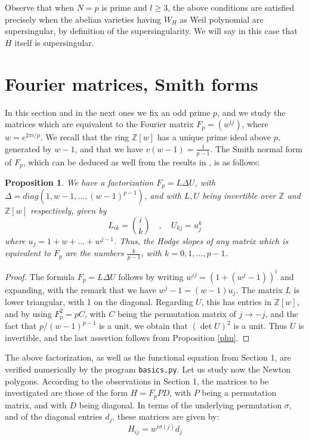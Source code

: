 \documentclass[11pt]{amsart}
\newtheorem{proposition}[theorem]{Proposition}
\theoremstyle{definition}
\begin{document}
Observe that when $N=p$ is prime and $l\geq3$, the above conditions are satisfied precisely when the abelian varieties having $W_H$ as Weil polynomial are supersingular, by definition of the supersingularity. We will say in this case that $H$ itself is supersingular.

\section{Fourier matrices, Smith forms}

In this section and in the next ones we fix an odd prime $p$, and we study the matrices which are equivalent to the Fourier matrix $F_p=(w^{ij})$, where $w=e^{2\pi i/p}$. We recall that the ring $\mathbb Z[w]$ has a unique prime ideal above $p$, generated by $w-1$, and that we have $v(w-1)=\frac{1}{p-1}$. The Smith normal form of $F_p$, which can be deduced as well from the results in \cite{kwe}, is as follows:

\begin{proposition}\label{psmith}
We have a factorization $F_p=L\Delta U$, with $\Delta=diag(1,w-1,\ldots,(w-1)^{p-1})$, and with $L,U$ being invertible over $\mathbb Z$ and $\mathbb Z[w]$ respectively, given by
$$L_{ik}=\binom{i}{k}\quad,\quad U_{kj}=u_j^k$$
where $u_j=1+w+\ldots+w^{j-1}$. Thus, the Hodge slopes of any matrix which is equivalent to $F_p$ are the numbers $\frac{k}{p-1}$, with $k=0,1,\ldots,p-1$.
\end{proposition}

\begin{proof}
The formula $F_p=L\Delta U$ follows by writing $w^{ij}=(1+(w^j-1))^i$ and expanding, with the remark that we have $w^j-1=(w-1)u_j$. The matrix $L$ is lower triangular, with 1 on the diagonal. Regarding $U$, this has entries in $\mathbb Z[w]$, and by using $F_p^2=pC$, with $C$ being the permutation matrix of $j\to-j$, and the fact that $p/(w-1)^{p-1}$ is a unit, we obtain that $(\det U)^2$ is a unit. Thus $U$ is invertible, and the last assertion follows from Proposition \ref{phn}.
\end{proof}

The above factorization, as well as the functional equation from Section 1, are verified numerically by the program \texttt{basics.py}. Let us study now the Newton polygons. According to the observations in Section 1, the matrices to be investigated are those of the form $H=F_pPD$, with $P$ being a permutation matrix, and with $D$ being diagonal. In terms of the underlying permutation $\sigma$, and of the diagonal entries $d_j$, these matrices are given by:
$$H_{ij}=w^{i\sigma(j)}d_j$$
\end{document}
